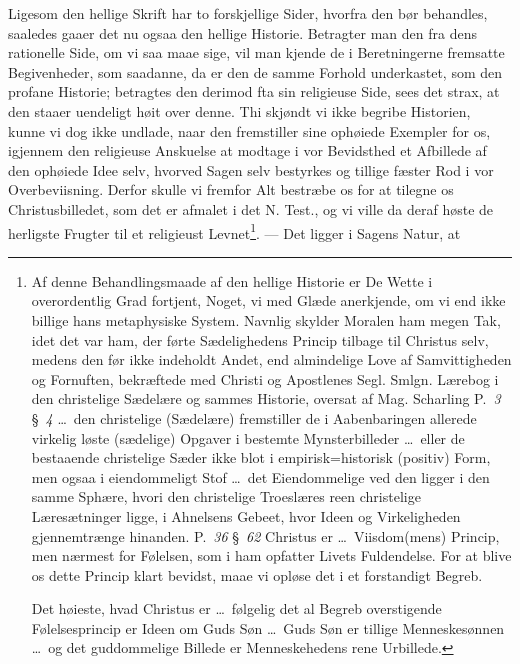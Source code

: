 \documentclass[12pt]{book}
\newcommand{\opage}[1]{\marginnote{\footnotesize\textit{[#1]}}}
\begin{document}
\opage{102} \setcounter{footnote}{0}%
Ligesom den hellige Skrift har to forskjellige Sider, hvorfra den bør
behandles, saaledes gaaer det nu ogsaa den hellige Historie. Betragter man den
fra dens rationelle Side, om vi saa maae sige, vil man kjende de i
Beretningerne fremsatte Begivenheder, som saadanne, da er den de samme Forhold
underkastet, som den profane Historie; betragtes den derimod fta sin
religieuse Side, sees det strax, at den staaer uendeligt høit over denne. Thi
skjøndt vi ikke begribe Historien, kunne vi dog ikke undlade, naar den
fremstiller sine ophøiede Exempler for os, igjennem den religieuse Anskuelse
at modtage i vor Bevidsthed et Afbillede af den ophøiede Idee selv, hvorved
Sagen selv bestyrkes og tillige fæster Rod i vor Overbeviisning. Derfor skulle
vi fremfor Alt bestræbe os for at tilegne os Christusbilledet, som det er
afmalet i det N. Test., og vi ville da deraf høste de herligste Frugter til et
religieust Levnet\footnote{Af denne Behandlingsmaade af den hellige Historie
er De Wette i overordentlig Grad fortjent, Noget, vi med Glæde anerkjende, om
vi end ikke billige hans metaphysiske System. Navnlig skylder Moralen ham
megen Tak, idet det var ham, der førte Sædelighedens Princip tilbage til
Christus selv, medens den før ikke indeholdt Andet, end almindelige Love af
Samvittigheden og Fornuften, bekræftede med Christi og Apostlenes Segl. Smlgn.
Lærebog i den christelige Sædelære og sammes Historie, oversat af Mag.
Scharling P.~\textit{3} §~\textit{4} \ldots\ den christelige (Sædelære)
fremstiller de i Aabenbaringen allerede virkelig løste (sædelige) Opgaver i
bestemte Mynsterbilleder \ldots\ eller de bestaaende christelige Sæder ikke
blot i empirisk=historisk (positiv) Form, men ogsaa i eiendommeligt Stof
\ldots\ det Eiendommelige ved den ligger i den samme Sphære, hvori den
christelige Troeslæres reen christelige Læresætninger ligge, i Ahnelsens
Gebeet, hvor Ideen og Virkeligheden gjennemtrænge hinanden. P.~\textit{36}
§~\textit{62} Christus er \ldots\ Viisdom(mens) Princip, men nærmest for
Følelsen, som i ham opfatter Livets Fuldendelse. For at blive os dette Princip
klart bevidst, maae vi opløse det i et forstandigt Begreb.

Det høieste, hvad Christus er \ldots\ følgelig det al Begreb overstigende
Følelsesprincip er Ideen om Guds Søn \ldots\ Guds Søn er tillige
Menneskesønnen \ldots\ og det guddommelige Billede er Menneskehedens rene
Urbillede.}. --- Det ligger i Sagens Natur, at
\end{document}

